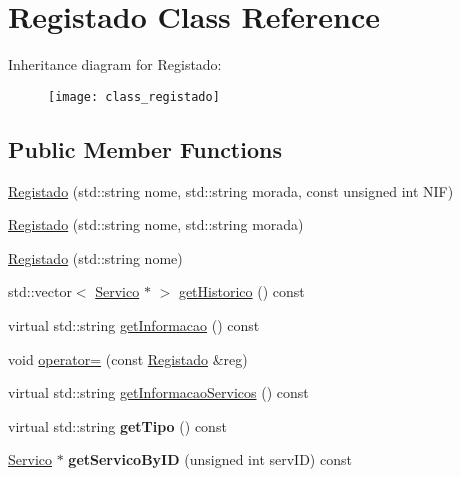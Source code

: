 \hypertarget{class_registado}{}\section{Registado Class Reference}
\label{class_registado}
Inheritance diagram for Registado\+:\begin{figure}[H]
\begin{center}
\leavevmode
\texttt{[image: class\_registado]}
\end{center}
\end{figure}
\subsection*{Public Member Functions}
\begin{DoxyCompactItemize}
\item 
\hyperlink{class_registado_ace8988ba72da772309e5aebf0bc82d4d}{Registado} (std\+::string nome, std\+::string morada, const unsigned int N\+IF)
\item 
\hyperlink{class_registado_a2ebad03ff43e207581c62952a88129b4}{Registado} (std\+::string nome, std\+::string morada)
\item 
\hyperlink{class_registado_a67a8d0c0dbd3103deae8813eb0958752}{Registado} (std\+::string nome)
\item 
std\+::vector$<$ \hyperlink{class_servico}{Servico} $\ast$ $>$ \hyperlink{class_registado_a304848f6ce1d82ad8438ec5e273cbc2d}{get\+Historico} () const
\item 
virtual std\+::string \hyperlink{class_registado_a7017f0d74afd44459c3d6affcb303d52}{get\+Informacao} () const
\item 
void \hyperlink{class_registado_a4570e0b507ef86f7fce56510f118a887}{operator=} (const \hyperlink{class_registado}{Registado} \&reg)
\item 
virtual std\+::string \hyperlink{class_registado_a15109adc7cd6a8834bd2ef909bcde008}{get\+Informacao\+Servicos} () const
\item 
\mbox{\label{class_registado_a3512b905e10ee9a629c4dbbdc692f420}} 
virtual std\+::string {\bfseries get\+Tipo} () const
\item 
\mbox{\label{class_registado_a6a5693eddb204d3a6da853da7ef8f8db}} 
\hyperlink{class_servico}{Servico} $\ast$ {\bfseries get\+Servico\+By\+ID} (unsigned int serv\+ID) const
\item 

\end{DoxyCompactItemize}
